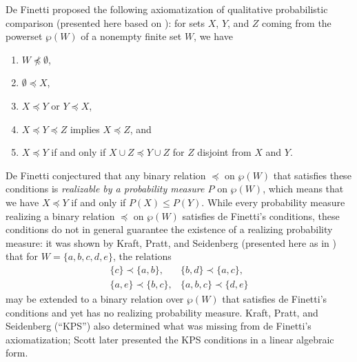\documentclass[12pt]{article}
\theoremstyle{definition}
\begin{document}
De Finetti \cite{deFinetti51,deFinetti37} proposed the following
axiomatization of qualitative probabilistic comparison (presented here
based on \cite{Sco64:JMP}): for sets $X$, $Y$, and $Z$ coming from the
powerset $\wp(W)$ of a nonempty finite set $W$, we have
\begin{enumerate}
\item $W\npreceq\emptyset$,

\item $\emptyset\preceq X$,
  
\item $X \preceq Y$ or $Y \preceq X$,

\item $X \preceq Y\preceq Z$ implies $X \preceq Z$, and
  
\item $X \preceq Y$ if and only if $X \cup Z \preceq Y \cup Z$ for $Z$
  disjoint from $X$ and $Y$.
\end{enumerate}
De Finetti conjectured that any binary relation $\preceq$ on $\wp(W)$
that satisfies these conditions is \emph{realizable by a probability
  measure $P$} on $\wp(W)$, which means that we have $X\preceq Y$ if
and only if $P(X)\leq P(Y)$.  While every probability measure
realizing a binary relation $\preceq$ on $\wp(W)$ satisfies de
Finetti's conditions, these conditions do not in general guarantee the
existence of a realizing probability measure: it was shown by Kraft,
Pratt, and Seidenberg \cite{KraPraSei59:AMS} (presented here as in
\cite{Segerberg1971:qpiams}) that for $W=\{a,b,c,d,e\}$, the relations
\begin{eqnarray*}
\{c\}\prec\{a,b\},
&
\{b,d\}\prec\{a,c\},
\\
\{a,e\}\prec\{b,c\},
&
\{a,b,c\}\prec\{d,e\}
\end{eqnarray*}
may be extended to a binary relation over $\wp(W)$ that satisfies de
Finetti's conditions and yet has no realizing probability measure.
Kraft, Pratt, and Seidenberg (``KPS'') also determined what was
missing from de Finetti's axiomatization; Scott \cite{Sco64:JMP} later
presented the KPS conditions in a linear algebraic form.
\end{document}
